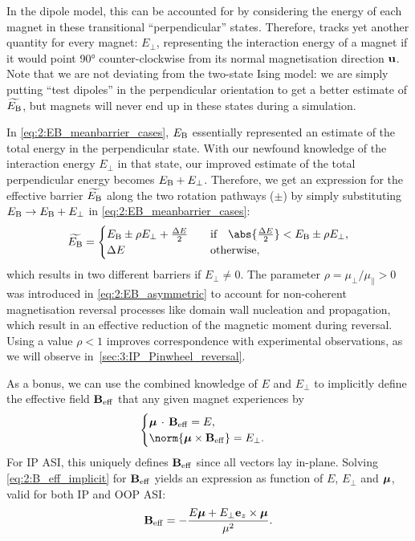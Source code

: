In the dipole model, this can be accounted for by considering the energy of each magnet in these transitional ``perpendicular'' states.
Therefore, \hotspice tracks yet another quantity for every magnet: $E_\perp$, representing the interaction energy of a magnet if it would point \ang{90} counter-clockwise from its normal magnetisation direction $\boldsymbol{\mathbf{u}}$.
Note that we are not deviating from the two-state Ising model: we are simply putting ``test dipoles'' in the perpendicular orientation to get a better estimate of $\widetilde{E_\mathrm{B}}$, but magnets will never end up in these states during a simulation. \par
In \cref{eq:2:EB_meanbarrier_cases}, $E_\mathrm{B}$ essentially represented an estimate of the total energy in the perpendicular state.
With our newfound knowledge of the interaction energy $E_\perp$ in that state, our improved estimate of the total perpendicular energy becomes $E_\mathrm{B} + E_\perp$.
Therefore, we get an expression for the effective barrier $\widetilde{E_\mathrm{B}}$ along the two rotation pathways ($\pm$) by simply substituting $E_\mathrm{B} \rightarrow E_\mathrm{B} + E_\perp$ in \cref{eq:2:EB_meanbarrier_cases}:
\begin{equation}
	\label{eq:2:EB_asymmetric}
	\widetilde{E_\mathrm{B}} = \begin{cases}
		E_\mathrm{B} \pm \rho E_\perp + \frac{\Delta E}{2} & \quad \text{if} \quad \abs{\frac{\Delta E}{2}} < E_\mathrm{B} \pm \rho E_\perp, \\
		\Delta E & \quad \text{otherwise}, \\
	\end{cases}
\end{equation}
which results in two different barriers if $E_\perp \neq 0$.
The parameter $\rho = \mu_\perp/\mu_\parallel > 0$ was introduced in \cref{eq:2:EB_asymmetric} to account for non-coherent magnetisation reversal processes like domain wall nucleation and propagation, which result in an effective reduction of the magnetic moment during reversal.~\cite{leo2021chiral,TimeResolvedDynamicsSOT}
Using a value $\rho < 1$ improves correspondence with experimental observations, as we will observe in~\cref{sec:3:IP_Pinwheel_reversal}. \par
As a bonus, we can use the combined knowledge of $E$ and $E_\perp$ to implicitly define the effective field $\boldsymbol{\mathbf{B}}_\mathrm{eff}$ that any given magnet experiences by
\begin{equation}
	\label{eq:2:B_eff_implicit}
	\begin{cases}
		\vc{\mu} \,\cdot\, \vc{B}_\mathrm{eff} = E \mathrm{,} \\
		\norm{\vc{\mu} \times \vc{B}_\mathrm{eff}} = E_\perp  \mathrm{.}
	\end{cases}
\end{equation}
For IP ASI, this uniquely defines $\boldsymbol{\mathbf{B}}_\mathrm{eff}$ since all vectors lay in-plane. Solving \cref{eq:2:B_eff_implicit} for $\boldsymbol{\mathbf{B}}_\mathrm{eff}$ yields an expression as function of $E$, $E_\perp$ and $\boldsymbol{\mathbf{\mu}}$, valid for both IP and OOP ASI:
\begin{equation}
	\label{eq:2:B_eff_explicit}
	\boldsymbol{\mathbf{B}}_\mathrm{eff} = - \frac{E \boldsymbol{\mathbf{\mu}} + E_\perp \boldsymbol{\mathbf{e}}_z \times \boldsymbol{\mathbf{\mu}}}{\mu^2} \mathrm{.}
\end{equation}

